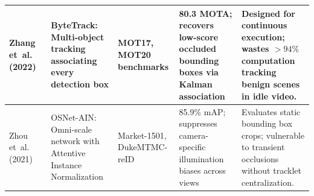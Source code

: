 \documentclass[12pt,a4paper]{report}
\begin{document}
\begin{table}[H]
{\begin{tabular}{|p{3.2cm}|p{3.8cm}|p{3.2cm}|p{4.2cm}|p{4.5cm}|}
\hline
Zhang et~al. (2022)~\cite{ref_zhang2022_bytetrack} & ByteTrack: Multi-object tracking associating every detection box & MOT17, MOT20 benchmarks & 80.3 MOTA; recovers low-score occluded bounding boxes via Kalman association & Designed for continuous execution; wastes $>94\%$ computation tracking benign scenes in idle video. \\
\hline
Zhou et~al. (2021)~\cite{ref_zhou2021_osnet_ain} & OSNet-AIN: Omni-scale network with Attentive Instance Normalization & Market-1501, DukeMTMC-reID & 85.9\% mAP; suppresses camera-specific illumination biases across views & Evaluates static bounding box crops; vulnerable to transient occlusions without tracklet centralization. \\
\hline
\end{tabular}%
}
\end{table}
\end{document}
